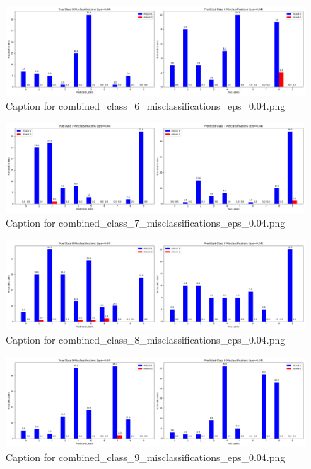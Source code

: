 \documentclass[11pt,onside]{article}
\begin{document}
\begin{figure}[ht]
\centering
\includegraphics[width=1\textwidth]{combined_class_boundary_pgd/combined_class_6_misclassifications_eps_0.04.png}
\caption{Caption for combined_class_6_misclassifications_eps_0.04.png}
\label{fig:combined_class_6_misclassifications_eps_0.04.png}
\end{figure}

\begin{figure}[ht]
\centering
\includegraphics[width=1\textwidth]{combined_class_boundary_pgd/combined_class_7_misclassifications_eps_0.04.png}
\caption{Caption for combined_class_7_misclassifications_eps_0.04.png}
\label{fig:combined_class_7_misclassifications_eps_0.04.png}
\end{figure}

\begin{figure}[ht]
\centering
\includegraphics[width=1\textwidth]{combined_class_boundary_pgd/combined_class_8_misclassifications_eps_0.04.png}
\caption{Caption for combined_class_8_misclassifications_eps_0.04.png}
\label{fig:combined_class_8_misclassifications_eps_0.04.png}
\end{figure}

\begin{figure}[ht]
\centering
\includegraphics[width=1\textwidth]{combined_class_boundary_pgd/combined_class_9_misclassifications_eps_0.04.png}
\caption{Caption for combined_class_9_misclassifications_eps_0.04.png}
\label{fig:combined_class_9_misclassifications_eps_0.04.png}
\end{figure}
\end{document}
